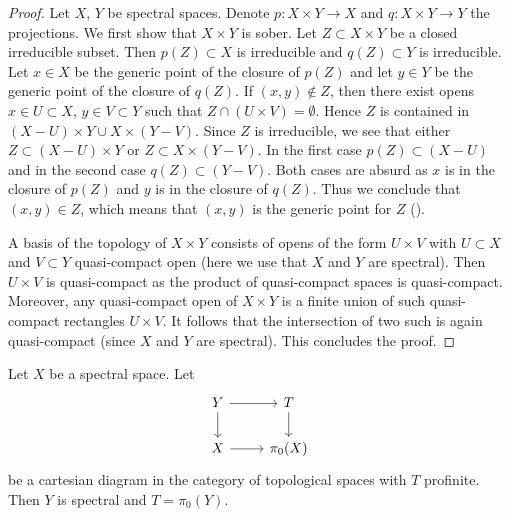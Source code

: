 \begin{proof}
  Let $X$, $Y$ be spectral spaces. Denote $p : X \times Y \to X$ and $q : X \times Y \to Y$ the projections. We first show that \(X \times Y\) is sober. Let $Z \subset X \times Y$ be a closed irreducible subset. Then $p(Z) \subset X$ is irreducible and $q(Z) \subset Y$ is irreducible. Let $x \in X$ be the generic point of the closure of $p(Z)$ and let $y \in Y$ be the generic point of the closure of $q(Z)$. If $(x, y) \notin Z$, then there exist opens $x \in U \subset X$, $y \in V \subset Y$ such that $Z \cap (U \times V) = \emptyset$. Hence $Z$ is contained in $(X - U) \times Y \cup X \times (Y - V)$. Since $Z$ is irreducible, we see that either $Z \subset (X - U) \times Y$ or $Z \subset X \times (Y - V)$. In the first case $p(Z) \subset (X - U)$ and in the second case $q(Z) \subset (Y - V)$. Both cases are absurd as $x$ is in the closure of $p(Z)$ and $y$ is in the closure of $q(Z)$. Thus we conclude that $(x, y) \in Z$, which means that $(x, y)$ is the generic point for $Z$ ().

  A basis of the topology of $X \times Y$ consists of opens of the form $U \times V$ with $U \subset X$ and $V \subset Y$ quasi-compact open (here we use that $X$ and $Y$ are spectral). Then $U \times V$ is quasi-compact as the product of quasi-compact spaces is quasi-compact. Moreover, any quasi-compact open of $X \times Y$ is a finite union of such quasi-compact rectangles $U \times V$. It follows that the intersection of two such is again quasi-compact (since $X$ and $Y$ are spectral). This concludes the proof.
\end{proof}

\begin{lemma}
Let $X$ be a spectral space. Let
\[
\begin{tikzcd}
Y \arrow[r] \arrow[d] & T \arrow[d] \\
X \arrow[r] & \pi_0(X)
\end{tikzcd}
\]
be a cartesian diagram in the category of topological spaces with $T$ profinite. Then $Y$ is spectral and $T = \pi_0(Y)$.
\label{thm:cartesian-profinite}
\end{lemma}

